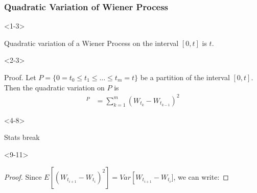\documentclass[10pt]{beamer}
\begin{document}
\begin{frame}[t]
  \frametitle{Quadratic Variation of Wiener Process}
    \begin{onlyenv}<1-3>
    \begin{theorem}
      Quadratic variation of a Wiener Process on the interval $[0,t]$ is $t$.
    \end{theorem}
    \end{onlyenv}
    \begin{onlyenv}<2-3>
      \begin{block}{Proof.}
        Let $P = \{0 = t_0 \leq t_1 \leq \dots \leq t_m = t\}$ be a partition of the interval $[0,t]$. Then the quadratic variation on $P$ is
        \begin{align*}
          [W]^{P} &= \displaystyle\sum_{k = 1}^{m}(W_{t_k} - W_{t_{k-1}})^2 
        \end{align*}
      \end{block}
    \end{onlyenv}
    \begin{onlyenv}<4-8>
      \begin{block}{Stats break}
      \end{block}
    \end{onlyenv}
    \begin{onlyenv}<9-11>
      \begin{proof}
      Since $E[(W_{t_{i+1}} - W_{t_{i}})^2] = Var\left[W_{t_{i+1}} - W_{t_{i}}]$, we can write:

\end{proof}
\end{onlyenv}
\end{frame}
\end{document}
